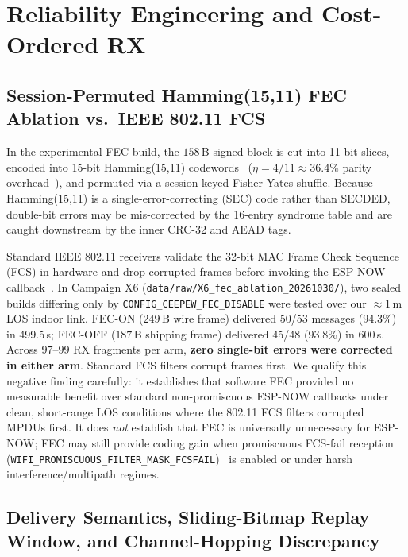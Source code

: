 \documentclass[conference]{IEEEtran}
\begin{document}
\section{Reliability Engineering and Cost-Ordered RX}

\subsection{Session-Permuted Hamming(15,11) FEC Ablation vs.\ IEEE 802.11 FCS}
In the experimental FEC build, the $158$\,B signed block is cut into 11-bit slices, encoded into 15-bit Hamming(15,11) codewords~\cite{hamming1950} ($\eta = 4/11 \approx 36.4\%$ parity overhead~\cite{lin2004}), and permuted via a session-keyed Fisher-Yates shuffle. Because Hamming(15,11) is a single-error-correcting (SEC) code rather than SECDED, double-bit errors may be mis-corrected by the 16-entry syndrome table and are caught downstream by the inner CRC-32 and AEAD tags.

Standard IEEE 802.11 receivers validate the 32-bit MAC Frame Check Sequence (FCS) in hardware and drop corrupted frames before invoking the ESP-NOW callback~\cite{yin2020}. In Campaign X6 (\texttt{data/raw/X6\_fec\_ablation\_20261030/}), two sealed builds differing only by \texttt{CONFIG\_CEEPEW\_FEC\_DISABLE} were tested over our $\approx 1$\,m LOS indoor link. FEC-ON ($249$\,B wire frame) delivered 50/53 messages (94.3\%) in 499.5\,s; FEC-OFF ($187$\,B shipping frame) delivered 45/48 (93.8\%) in 600\,s. Across $97$--$99$ RX fragments per arm, \textbf{zero single-bit errors were corrected in either arm}. Standard FCS filters corrupt frames first. We qualify this negative finding carefully: it establishes that software FEC provided no measurable benefit over standard non-promiscuous ESP-NOW callbacks under clean, short-range LOS conditions where the 802.11 FCS filters corrupted MPDUs first. It does \emph{not} establish that FEC is universally unnecessary for ESP-NOW; FEC may still provide coding gain when promiscuous FCS-fail reception (\texttt{WIFI\_PROMISCUOUS\_FILTER\_MASK\_FCSFAIL})~\cite{yin2020} is enabled or under harsh interference/multipath regimes.

\subsection{Delivery Semantics, Sliding-Bitmap Replay Window, and Channel-Hopping Discrepancy}
\end{document}

